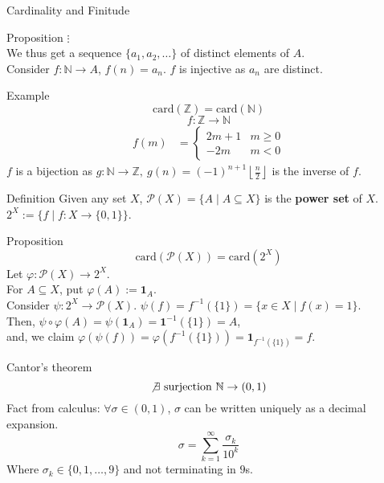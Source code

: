 \documentclass[8pt]{extarticle}
\begin{document}
\begin{problem}{Cardinality and Finitude}
\begin{problem}{Proposition}
      $\vdots$\\

      We thus get a sequence $\{a_1,a_2,\dots\}$ of distinct elements of $A$.\\

      Consider $f:\mathbb{N} \rightarrow A$, $f(n) = a_n$. $f$ is injective as $a_n$ are distinct.
    \end{problem}
    \begin{problem}{Example}
      \[
        \textrm{card}(\mathbb{Z}) = \textrm{card}(\mathbb{N})
      \] 
      \tcblower
      \[
        f:\mathbb{Z} \rightarrow \mathbb{N}
      \] 
      \begin{align*}
        f(m) &= \begin{cases}
          2m + 1 & m\geq 0\\
          -2m & m<0
        \end{cases}
      \end{align*}
      $f$ is a bijection as $g:\mathbb{N} \rightarrow \mathbb{Z},~g(n) = (-1)^{n+1}\left\lfloor \frac{n}{2}\right\rfloor$ is the inverse of $f$.
    \end{problem}
    \begin{problem}{Definition}
      Given any set $X$, $\mathcal{P}(X) = \{A \mid A\subseteq X\}$ is the \textbf{power set} of $X$.\\

      $2^X:= \{f\mid f:X\rightarrow \{0,1\}\}$.
    \end{problem}
    \begin{problem}{Proposition}
      \[
        \textrm{card}(\mathcal{P}(X)) = \textrm{card}(2^X)
      \] 
      \tcblower
      Let $\varphi: \mathcal{P}(X) \rightarrow 2^X$.\\

      For $A\subseteq X$, put $\varphi(A) := \mathbf{1}_A$.\\

      Consider $\psi: 2^X \rightarrow \mathcal{P}(X)$. $\psi(f) = f^{-1}(\{1\}) = \{x\in X \mid f(x) = 1\}$.\\

      Then, $\psi\circ\varphi(A) = \psi(\mathbf{1}_A) = \mathbf{1}^{-1}(\{1\}) = A$,\\

      and, we claim $\varphi(\psi(f)) = \varphi(f^{-1}(\{1\})) = \mathbf{1}_{f^{-1}(\{1\})} = f$.
    \end{problem}
    \begin{problem}{Cantor's theorem}
      \[
        \not\exists~\textrm{surjection}~\mathbb{N}\rightarrow (0,1)
      \] 
      \tcblower
      Fact from calculus: $\forall \sigma\in (0,1)$, $\sigma$ can be written uniquely as a decimal expansion.
      \[
        \sigma = \sum_{k=1}^{\infty} \frac{\sigma_k}{10^k}
      \] 
      Where $\sigma_k\in \{0,1,\dots,9\}$ and not terminating in $9$s.\\


\end{problem}
\end{problem}
\end{document}
